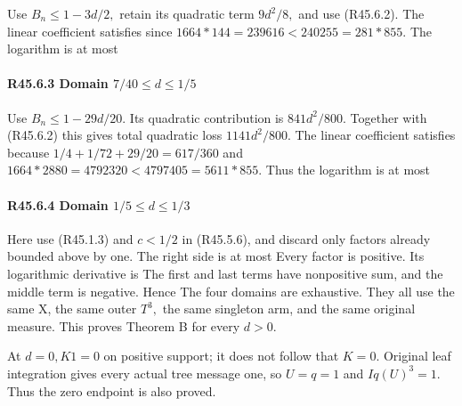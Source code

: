 Use \(B_n\le 1-3d/2,\allowbreak \) retain its quadratic term \(9d^2/8,\allowbreak \) and use (R45.6.2).
The linear coefficient satisfies
since \(1664*144=239616<240255=281*855.\) The logarithm is at most

\paragraph{R45.6.3 Domain \(7/40\le d\le 1/5\)}

Use \(B_n\le 1-29d/20.\) Its quadratic contribution is \(841d^2/800.\)
Together with (R45.6.2) this gives total quadratic loss \(1141d^2/800.\)
The linear coefficient satisfies
because \(1/4+1/72+29/20=617/360\) and
\(1664*2880=4792320<4797405=5611*855.\) Thus the logarithm is at most

\paragraph{R45.6.4 Domain \(1/5\le d\le 1/3\)}

Here use (R45.1.3) and \(c<1/2\) in (R45.5.6), and discard only factors already
bounded above by one. The right side is at most
Every factor is positive. Its logarithmic derivative is
The first and last terms have nonpositive sum, and the middle term is
negative. Hence
The four domains are exhaustive. They all use the same X, the same
outer \(T^3,\allowbreak \) the same singleton arm, and the same original measure.
This proves Theorem B for every \(d>0.\)

At \(d=0,\allowbreak  K1=0\) on positive support; it does not follow that \(K=0.\)
Original leaf integration gives every actual tree message one, so
\(U=q=1\) and \(Iq(U)^3=1.\) Thus the zero endpoint is also proved.
